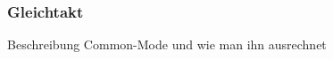 \subsubsection{Gleichtakt} \label{subsec:gleichtakt}
Beschreibung Common-Mode und wie man ihn ausrechnet
